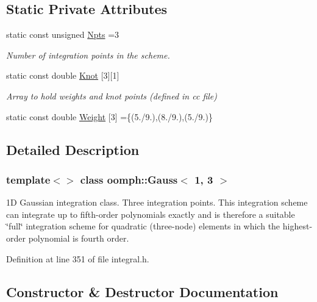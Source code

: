 \subsection*{Static Private Attributes}
\begin{DoxyCompactItemize}
\item 
static const unsigned \hyperlink{classoomph_1_1Gauss_3_011_00_013_01_4_a303e40987dc6ba6449d7e43949055402}{Npts} =3
\begin{DoxyCompactList}\small\item\em Number of integration points in the scheme. \end{DoxyCompactList}\item 
static const double \hyperlink{classoomph_1_1Gauss_3_011_00_013_01_4_a73a1e6a0f0cb9b93070d255a90db54e7}{Knot} \mbox{[}3\mbox{]}\mbox{[}1\mbox{]}
\begin{DoxyCompactList}\small\item\em Array to hold weights and knot points (defined in cc file) \end{DoxyCompactList}\item 
static const double \hyperlink{classoomph_1_1Gauss_3_011_00_013_01_4_a2693359d8c45ff049ee0b68fc67a3199}{Weight} \mbox{[}3\mbox{]} =\{(5./9.),(8./9.),(5./9.)\}
\end{DoxyCompactItemize}


\subsection{Detailed Description}
\subsubsection*{template$<$$>$\newline
class oomph\+::\+Gauss$<$ 1, 3 $>$}

1D Gaussian integration class. Three integration points. This integration scheme can integrate up to fifth-\/order polynomials exactly and is therefore a suitable \char`\"{}full\char`\"{} integration scheme for quadratic (three-\/node) elements in which the highest-\/order polynomial is fourth order. 

Definition at line 351 of file integral.\+h.



\subsection{Constructor \& Destructor Documentation}
\mbox{\label{classoomph_1_1Gauss_3_011_00_013_01_4_aab9cc062b967a5ecdd8672b0b1a76786}} 
